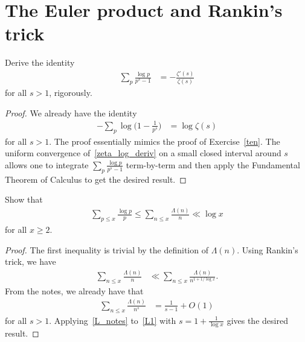\documentclass[11pt]{article}
\newenvironment{ex}[1]
  {\renewcommand\theinnercustomthm{#1}\innercustomthm}
  {\endinnercustomthm}
\begin{document}

\section{The Euler product and Rankin's trick}


\begin{ex}{16}\label{sixteen}
Derive the identity
\begin{align}
\sum_p\frac{\log{p}}{p^s-1} &= -\frac{\zeta'(s)}{\zeta(s)}\label{zeta_log_deriv}
\end{align}
for all $s>1$, rigorously.
\end{ex}

\begin{proof}
We already have the identity
\begin{align}
-\sum_p\log{\bigg(1-\frac{1}{p^s}\bigg)} &= \log{\zeta(s)}\label{log_zeta}
\end{align}
for all $s>1$. The proof essentially mimics the proof of Exercise~\ref{ten}. The uniform convergence of~\eqref{zeta_log_deriv} on a small closed interval around $s$ allows one to integrate $\sum_p\frac{\log{p}}{p^s-1}$ term-by-term and then apply the Fundamental Theorem of Calculus to get the desired result.
\end{proof}


\begin{ex}{17}\label{seventeen}
Show that
\begin{align*}
\sum_{p\leq x}\frac{\log{p}}{p} \leq \sum_{n\leq x}\frac{\Lambda(n)}{n} \ll \log{x}
\end{align*}
for all $x\geq 2$.
\end{ex}

\begin{proof}
The first inequality is trivial by the definition of $\Lambda(n)$. Using Rankin's trick, we have
\begin{align}
\sum_{n\leq x}\frac{\Lambda(n)}{n} &\ll \sum_{n\leq x}\frac{\Lambda(n)}{n^{1+1/\log{x}}}.\label{L1}
\end{align}
From the notes, we already have that
\begin{align}
\sum_{n\leq x}\frac{\Lambda(n)}{n^s} &= \frac{1}{s-1}+O(1)\label{L_notes}
\end{align}
for all $s>1$. Applying~\eqref{L_notes} to~\eqref{L1} with $s = 1+\frac{1}{\log{x}}$ gives the desired result.
\end{proof}
\end{document}
